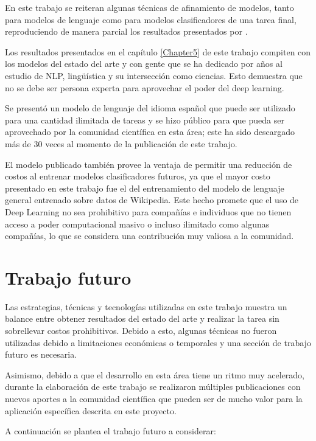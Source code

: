 En este trabajo se reiteran algunas técnicas de afinamiento de modelos, tanto para modelos de lenguaje como para modelos clasificadores de una tarea final, reproduciendo de manera parcial los resultados presentados por \citeauthor{howard2018}.

Los resultados presentados en el capítulo \ref{Chapter5} de este trabajo compiten con los modelos del estado del arte y con gente que se ha dedicado por años al estudio de NLP, lingüística y su intersección como ciencias. Esto demuestra que no se debe ser persona experta para aprovechar el poder del deep learning.

Se presentó un modelo de lenguaje del idioma español que puede ser utilizado para una cantidad ilimitada de tareas y se hizo público para que pueda ser aprovechado por la comunidad científica en esta área; este ha sido descargado más de 30 veces al momento de la publicación de este trabajo.

El modelo publicado también provee la ventaja de permitir una reducción de costos al entrenar modelos clasificadores futuros, ya que el mayor costo presentado en este trabajo fue el del entrenamiento del modelo de lenguaje general entrenado sobre datos de Wikipedia. Este hecho promete que el uso de Deep Learning no sea prohibitivo para compañías e individuos que no tienen acceso a poder computacional masivo o incluso ilimitado como algunas compañías, lo que se considera una contribución muy valiosa a la comunidad.

\section{Trabajo futuro}

Las estrategias, técnicas y tecnologías utilizadas en este trabajo muestra un balance entre obtener resultados del estado del arte y realizar la tarea sin sobrellevar costos prohibitivos. Debido a esto, algunas técnicas no fueron utilizadas debido a limitaciones económicas o temporales y una sección de trabajo futuro es necesaria.

Asimismo, debido a que el desarrollo en esta área tiene un ritmo muy acelerado, durante la elaboración de este trabajo se realizaron múltiples publicaciones con nuevos aportes a la comunidad científica que pueden ser de mucho valor para la aplicación específica descrita en este proyecto.

A continuación se plantea el trabajo futuro a considerar:


